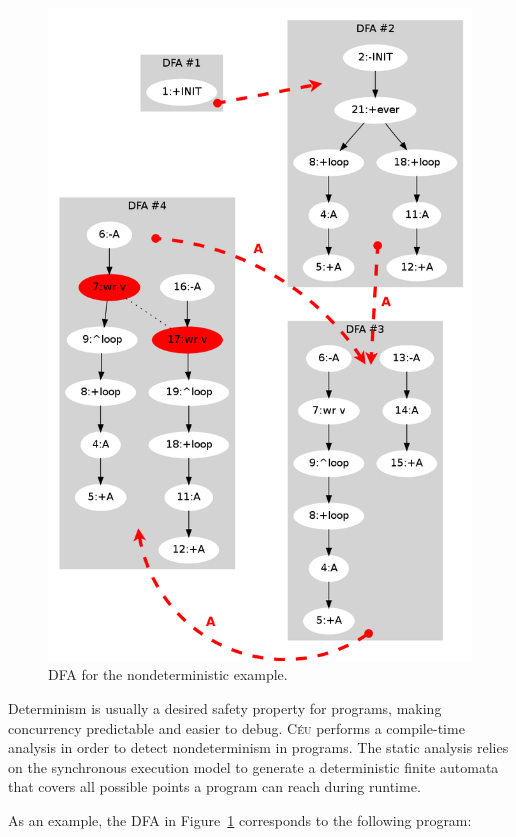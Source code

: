 \documentclass{sig-alternate}
\newcommand{\2}{\;\;}
\newcommand{\5}{\;\;\;\;\;}
\newcommand{\CEU}{\textsc{C\'{e}u}}
\begin{document}
\begin{figure}[t]
\centering
\includegraphics[scale=0.25]{dfa.png}
\caption{ DFA for the nondeterministic example.
\label{fig:dfa}
}
\end{figure}

Determinism is usually a desired safety property for programs, making 
concurrency predictable and easier to debug.
\CEU{} performs a compile-time analysis in order to detect nondeterminism in 
programs.
The static analysis relies on the synchronous execution model to generate a 
deterministic finite automata that covers all possible points a program can 
reach during runtime.

As an example, the DFA in Figure~\ref{fig:dfa} corresponds to the following 
program:
\end{document}

